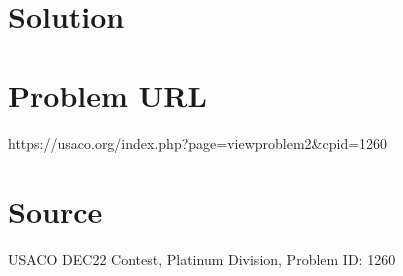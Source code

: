 \documentclass[12pt]{article}
\begin{document}
\section*{Solution}


\section*{Problem URL}
https://usaco.org/index.php?page=viewproblem2&cpid=1260

\section*{Source}
USACO DEC22 Contest, Platinum Division, Problem ID: 1260
\end{document}

